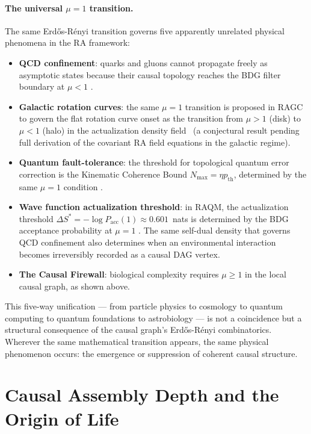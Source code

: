 \documentclass[11pt,a4paper]{article}
\theoremstyle{plain}
\theoremstyle{definition}
\theoremstyle{remark}
\begin{document}
\paragraph{The universal $\mu = 1$ transition.}
The same Erd\H{o}s-R\'{e}nyi transition governs five apparently unrelated
physical phenomena in the RA framework:
\begin{itemize}[noitemsep]
  \item \textbf{QCD confinement}: quarks and gluons cannot propagate freely
    as asymptotic states because their causal topology reaches the BDG
    filter boundary at $\mu < 1$ \citep{Sandeman2026RATM}.
  \item \textbf{Galactic rotation curves}: the same $\mu = 1$ transition is
    proposed in RAGC to govern the flat rotation curve onset as the transition
    from $\mu > 1$ (disk) to $\mu < 1$ (halo) in the actualization density
    field~\citep{Sandeman2026RAGC} (a conjectural result pending full derivation
    of the covariant RA field equations in the galactic regime).
  \item \textbf{Quantum fault-tolerance}: the threshold for topological
    quantum error correction is the Kinematic Coherence Bound
    $N_{\max} = \eta p_{\mathrm{th}}$, determined by the same $\mu = 1$
    condition \citep{Sandeman2026RAQI}.
  \item \textbf{Wave function actualization threshold}: in RAQM, the
    actualization threshold $\Delta S^* = -\log P_{\mathrm{acc}}(1) \approx
    0.601$~nats is determined by the BDG acceptance probability at $\mu = 1$
    \citep{Sandeman2026RAQM}. The same self-dual density that governs
    QCD confinement also determines when an environmental interaction
    becomes irreversibly recorded as a causal DAG vertex.
  \item \textbf{The Causal Firewall}: biological complexity requires
    $\mu \geq 1$ in the local causal graph, as shown above.
\end{itemize}
This five-way unification --- from particle physics to cosmology to quantum
computing to quantum foundations to astrobiology --- is not a coincidence
but a structural consequence of the causal graph's Erd\H{o}s-R\'{e}nyi
combinatorics. Wherever the same mathematical transition appears, the same
physical phenomenon occurs: the emergence or suppression of coherent causal
structure.

\section{Causal Assembly Depth and the Origin of Life}
\label{sec:ara}
\end{document}
